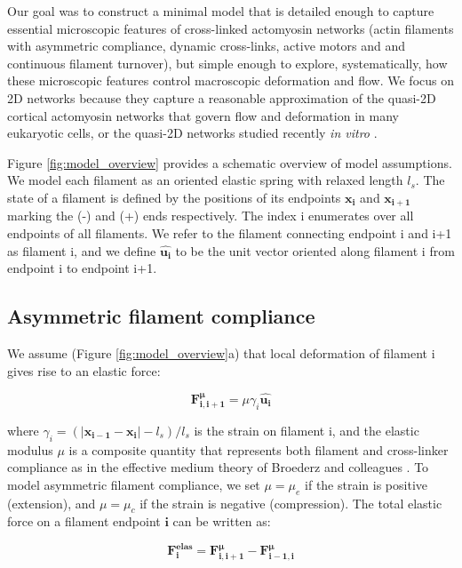 \documentclass[10pt,letterpaper]{article}
\begin{document}
Our goal was to construct a minimal model that is detailed enough to capture essential microscopic features of cross-linked actomyosin networks (actin filaments with asymmetric compliance, dynamic cross-links, active motors and and continuous filament turnover), but simple enough to explore, systematically, how these microscopic features control macroscopic deformation and flow. We focus on 2D networks because they capture a reasonable approximation of the quasi-2D cortical actomyosin networks that govern flow and deformation in many eukaryotic cells\cite{cellmech_flows, salbreuxbphs}, or the quasi-2D networks studied recently {\em in vitro} \cite{rheo_2D1,rheo_2D2}.

Figure \ref{fig:model_overview} provides a schematic overview of model assumptions. We model each filament as an oriented elastic spring with relaxed length $l_s$. The state of a filament is defined by the positions of its endpoints $\mathbf{x_i}$ and $\mathbf{x_{i+1}}$ marking the (-) and (+) ends respectively. The index i enumerates over all endpoints of all filaments. We refer to the filament connecting endpoint i and i+1 as filament i, and we define $\mathbf{\hat{u_i}}$ to be the unit vector oriented along filament i from endpoint i to endpoint i+1.

\subsection*{Asymmetric filament compliance}
We assume (Figure \ref{fig:model_overview}a) that local deformation of filament  i gives rise to an elastic force:

\begin{equation}
\label{eqn:spring}
\mathbf{F^{\mu}_{i,i+1}} = \mu \gamma_{i}  \mathbf{\hat{u_i}}
\end{equation}


where $ \gamma_{i} = (|\mathbf{x_{i-1}}-\mathbf{x_i}|-l_s)/l_s$ is the strain on filament i, and the elastic modulus  $\mu$ is a composite quantity that represents both filament and cross-linker compliance as in the effective medium theory of Broederz and colleagues \cite{theo_crosslinknonlinear}.  To model asymmetric filament compliance, we set $\mu = \mu_e$ if the strain is positive (extension), and $\mu = \mu_c$ if the strain is negative (compression). The total elastic force on a filament endpoint $\mathbf{i}$ can be written as:

\begin{equation}
\label{eqn:internal}
\mathbf{F^{elas}_i} =  \mathbf{F^{\mu}_{i,i+1}} - \mathbf{F^{\mu}_{i-1,i}} 
\end{equation}
\end{document}
